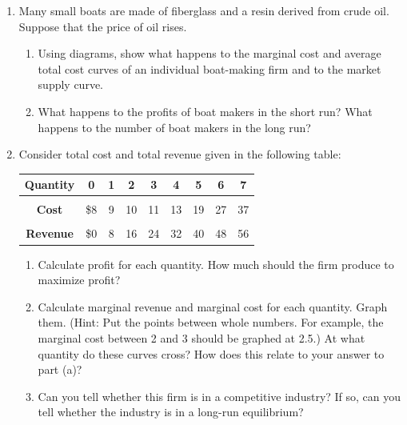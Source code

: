 \documentclass{article}
\begin{document}
\begin{enumerate}

\item Many small boats are made of fiberglass and a resin derived from crude oil. Suppose that the price of oil rises.

	\begin{enumerate}
	
	\item Using diagrams, show what happens to the marginal cost and average total cost curves of an individual boat-making firm and to the market supply curve.
	
	\item What happens to the profits of boat makers in the short run? What happens to the number of boat makers in the long run? 
	
	\end{enumerate}
	
\setcounter{enumi}{2}
\item Consider total cost and total revenue given in the following table:

	\begin{center}
	\begin{tabular}{ c | c | c | c | c | c | c | c | c}
	\textbf{Quantity} & 0 & 1 & 2 & 3 & 4 & 5 & 6 & 7 \\
	\hline
	\makecell{\textbf{Total}\\\textbf{Cost}} & \$8 & 9 & 10 & 11 & 13 & 19 & 27 & 37 \\
	\hline
	\makecell{\textbf{Total}\\\textbf{Revenue}} & \$0 & 8 & 16 & 24 & 32 & 40 & 48 & 56
	\end{tabular}
	\end{center}
	
	\begin{enumerate}
	
	\item Calculate profit for each quantity. How much should the firm produce to maximize profit?
	
	\item Calculate marginal revenue and marginal cost for each quantity. Graph them. (Hint: Put the points between whole numbers. For example, the marginal cost between 2 and 3 should be graphed at 2.5.) At what quantity do these curves cross? How does this relate to your answer to part (a)?
	
	\item Can you tell whether this firm is in a competitive industry? If so, can you tell whether the industry is in a long-run equilibrium?
	

\end{enumerate}
\end{enumerate}
\end{document}

